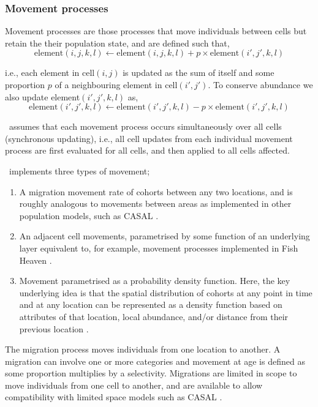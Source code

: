 \subsubsection{Movement processes}

Movement processes are those processes that move individuals between cells but retain the their population state, and are defined such that,
\begin{equation}
\text{element}(i,j,k,l)\leftarrow \text{element}(i,j,k,l) + p \times \text{element}(i',j',k,l)
\end{equation}

i.e., each element in cell$(i,j)$ is updated as the sum of itself and some proportion $p$ of a neighbouring element in cell$(i',j')$. To conserve abundance we also update element$(i',j',k,l)$ as,
\begin{equation}
\text{element}(i',j',k,l)\leftarrow \text{element}(i',j',k,l) - p\times \text{element}(i',j',k,l)
\end{equation}

\SPM\ assumes that each movement process occurs simultaneously over all cells (synchronous updating), i.e., all cell updates from each individual movement process are first evaluated for all cells, and then applied to all cells affected. 

\SPM\ implements three types of movement;
\begin{enumerate}
	\item  A migration movement rate of cohorts between any two locations, and is roughly analogous to movements between areas as implemented in other population models, such as CASAL \citep{1388}. 
	\item An adjacent cell movements, parametrised by some function of an underlying layer \textemdash equivalent to, for example, movement processes implemented in Fish Heaven \citep{1136,1135}.
	\item Movement parametrised as a probability density function. Here, the key underlying idea is that the spatial distribution of cohorts at any point in time and at any location can be represented as a density function based on attributes of that location, local abundance, and/or distance from their previous location \citep{1366,1367}. 
\end{enumerate}

The migration process moves individuals from one location to another. A migration can involve one or more categories and movement at age is defined as some proportion multiplies by a selectivity. Migrations are limited in scope to move individuals from one cell to another, and are available to allow compatibility with limited space models such as CASAL \cite{1388}.

